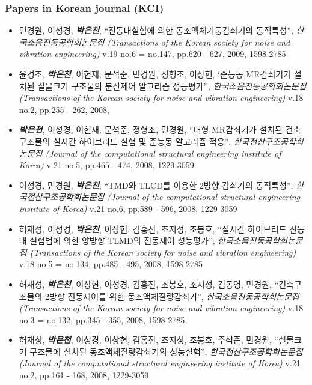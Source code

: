 \subsubsection*{Papers in Korean journal (KCI)}
\begin{itemize}
\item[]
  민경원, 이성경, \emph{\textbf{박은천}}, ``진동대실험에 의한
  동조액체기둥감쇠기의 동적특성'', \emph{한국소음진동공학회논문집
  (Transactions of the Korean society for noise and vibration
  engineering)} v.19 no.6 = no.147, pp.620 - 627, 2009, 1598-2785
\item[]
  윤경조, \emph{\textbf{박은천}}, 이헌재, 문석준, 민경원, 정형조, 이상현, `준능동 MR감쇠기가 설치된 실물크기 구조물의 분산제어 알고리즘 성능평가'', \emph{한국소음진동공학회논문집
  (Transactions of the Korean society for noise and vibration
  engineering)} v.18 no.2, pp.255 - 262, 2008,
\item[]
  \emph{\textbf{박은천}}, 이성경, 이헌재, 문석준, 정형조, 민경원, ``대형
  MR감쇠기가 설치된 건축구조물의 실시간 하이브리드 실험 및 준능동
  알고리즘 적용'', \emph{한국전산구조공학회논문집 (Journal of the
  computational structural engineering institute of Korea)} v.21 no.5,
  pp.465 - 474, 2008, 1229-3059
\item[]
  이성경, 민경원, \emph{\textbf{박은천}}, ``TMD와 TLCD를 이용한 2방향 감쇠기의
  동적특성'', \emph{한국전산구조공학회논문집 (Journal of the
  computational structural engineering institute of Korea)} v.21 no.6,
  pp.589 - 596, 2008, 1229-3059
\item[]
  허재성, 이성경, \emph{\textbf{박은천}}, 이상현, 김홍진, 조지성, 조봉호,
  ``실시간 하이브리드 진동대 실험법에 의한 양방향 TLMD의 진동제어
  성능평가'', \emph{한국소음진동공학회논문집 (Transactions of the Korean
  society for noise and vibration engineering)} v.18 no.5 = no.134,
  pp.485 - 495, 2008, 1598-2785
\item[]
  허재성, \emph{\textbf{박은천}}, 이상현, 이성경, 김홍진, 조봉호, 조지성,
  김동영, 민경원, ``건축구조물의 2방향 진동제어를 위한
  동조액체질량감쇠기'', \emph{한국소음진동공학회논문집 (Transactions of
  the Korean society for noise and vibration engineering)} v.18 no.3 =
  no.132, pp.345 - 355, 2008, 1598-2785
\item[]
  허재성, \emph{\textbf{박은천}}, 이성경, 이상현, 김홍진, 조지성, 조봉호,
  주석준, 민경원, ``실물크기 구조물에 설치된 동조액체질량감쇠기의
  성능실험'', \emph{한국전산구조공학회논문집 (Journal of the
  computational structural engineering institute of Korea)} v.21 no.2,
  pp.161 - 168, 2008, 1229-3059

\end{itemize}
